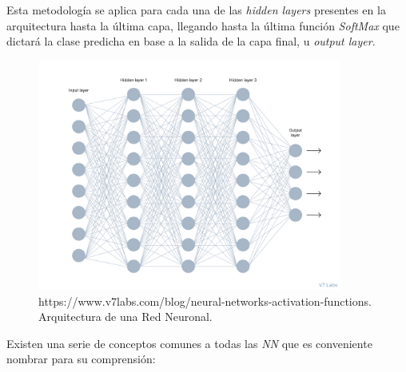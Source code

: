             Esta metodología se aplica para cada una de las \textit{hidden layers} presentes en la arquitectura hasta la última capa, llegando hasta la última función \textit{SoftMax} que dictará la clase predicha en base a la salida de la capa final, u \textit{output layer}.\\

            \begin{figure}[h]
                \centering
                \includegraphics[width=10cm]{archivos/NNImage}
                \caption{https://www.v7labs.com/blog/neural-networks-activation-functions. Arquitectura de una Red Neuronal.}
                \label{NNImage}
             \end{figure}



            Existen una serie de conceptos comunes a todas las \textit{NN} que es conveniente nombrar para su comprensión:


